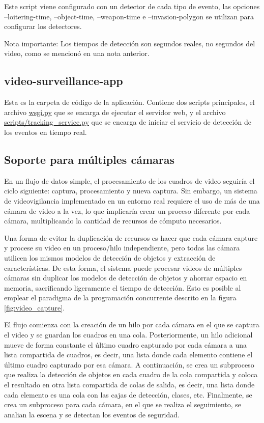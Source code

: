 \documentclass[11pt,a4paper]{article}
\begin{document}
Este script viene configurado con un detector de cada tipo de evento, las opciones --loitering-time, --object-time, --weapon-time e --invasion-polygon se utilizan para configurar los detectores.

Nota importante: Los tiempos de detección son segundos reales, no segundos del video, como se mencionó en una nota anterior.

\subsection{video-surveillance-app}

Esta es la carpeta de código de la aplicación. Contiene dos scripts principales, el archivo \url{wsgi.py} que se encarga de ejecutar el servidor web, y el archivo \url{scripts/tracking_service.py} que se encarga de iniciar el servicio de detección de los eventos en tiempo real.

\subsection{Soporte para múltiples cámaras}

En un flujo de datos simple, el procesamiento de los cuadros de video seguiría el ciclo siguiente: captura, procesamiento y nueva captura. Sin embargo, un sistema de videovigilancia implementado en un entorno real requiere el uso de más de una cámara de video a la vez, lo que implicaría crear un proceso diferente por cada cámara, multiplicando la cantidad de recursos de cómputo necesarios.

Una forma de evitar la duplicación de recursos es hacer que cada cámara capture y procese su video en un proceso/hilo independiente, pero todas las cámara utilicen los mismos modelos de detección de objetos y extracción de características. De esta forma, el sistema puede procesar videos de múltiples cámaras sin duplicar los modelos de detección de objetos y ahorrar espacio en memoria, sacrificando ligeramente el tiempo de detección. Esto es posible al emplear el paradigma de la programación concurrente descrito en la figura \ref{fig:video_capture}.

El flujo comienza con la creación de un hilo por cada cámara en el que se captura el video y se guardan los cuadros en una cola. Posteriormente, un hilo adicional mueve de forma constante el último cuadro capturado por cada cámara a una lista compartida de cuadros, es decir, una lista donde cada elemento contiene el último cuadro capturado por esa cámara. A continuación, se crea un subproceso que realiza la detección de objetos en cada cuadro de la cola compartida y coloca el resultado en otra lista compartida de colas de salida, es decir, una lista donde cada elemento es una cola con las cajas de detección, clases, etc. Finalmente, se crea un subproceso para cada cámara, en el que se realiza el seguimiento, se analian la escena y se detectan los eventos de seguridad.
\end{document}
